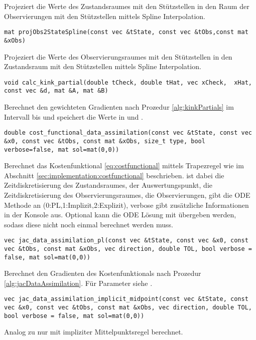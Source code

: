 Projeziert die Werte  des Zustandsraumes mit den Stützstellen  in den Raum der Observierungen mit den Stützstellen  mittels Spline Interpolation.
\begin{lstlisting}[numbers=none]
mat projObs2StateSpline(const vec &tState, const vec &tObs,const mat &xObs)
\end{lstlisting}
Projeziert die Werte  des Observierungsraumes mit den Stützstellen  in den Zustandsraum mit den Stützstellen  mittels Spline Interpolation.
%
\begin{lstlisting}[numbers=none]
void calc_kink_partial(double tCheck, double tHat, vec xCheck,  xHat, const vec &d, mat &A, mat &B)
\end{lstlisting}
Berechnet den gewichteten Gradienten nach Prozedur \ref{alg:kinkPartials} im Intervall  bis  und speichert die Werte in  und .
\begin{lstlisting}[numbers=none]
double cost_functional_data_assimilation(const vec &tState, const vec &x0, const vec &tObs, const mat &xObs, size_t type, bool verbose=false, mat sol=mat(0,0))
\end{lstlisting}
Berechnet das Kostenfunktional \eqref{eq:costfunctional} mittels Trapezregel wie im Abschnitt \ref{sec:implementation:costfunctional} beschrieben.  ist dabei die Zeitdiskretisierung des Zustandsraumes,  der Auswertungspunkt,  die Zeitdiskretisierung des Observierungsraumes,  die Observierungen,  gibt die ODE Methode an (0:PL,1:Implizit,2:Explizit), verbose gibt zusätzliche Informationen in der Konsole aus. Optional kann die ODE Lösung  mit übergeben werden, sodass diese nicht noch einmal berechnet werden muss.  
\begin{lstlisting}[numbers=none]
vec jac_data_assimilation_pl(const vec &tState, const vec &x0, const vec &tObs, const mat &xObs, vec direction, double TOL, bool verbose = false, mat sol=mat(0,0))
\end{lstlisting}
Berechnet den Gradienten des Kostenfunktionals nach Prozedur \ref{alg:jacDataAssimilation}. Für Parameter siehe .
\begin{lstlisting}[numbers=none]
vec jac_data_assimilation_implicit_midpoint(const vec &tState, const vec &x0, const vec &tObs, const mat &xObs, vec direction, double TOL, bool verbose = false, mat sol=mat(0,0))
\end{lstlisting}
Analog zu  nur mit impliziter Mittelpunktsregel berechnet.
